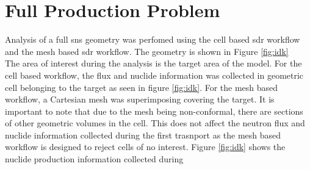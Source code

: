\section{Full Production Problem}
Analysis of a full \gls{sns} geometry was perfomed using the cell
based \gls{sdr} workflow and the mesh based \gls{sdr} workflow.
The geometry is shown in Figure \ref{fig:idk}\\
The area of interest during the analysis is the target area of the model.
For the cell based workflow, the flux and nuclide information was collected
in geometric cell belonging to the target as seen in figure \ref{fig:idk}.
For the mesh based workflow, a Cartesian mesh was superimposing covering the
target. It is important to note that due to the mesh being non-conformal, there
are sections of other geometric volumes in the cell. This does not affect the
neutron flux and nuclide information collected during the first trasnport as
the mesh based workflow is designed to reject cells of no interest.
Figure \ref{fig:idk} shows the nuclide production information collected during

\newpage
